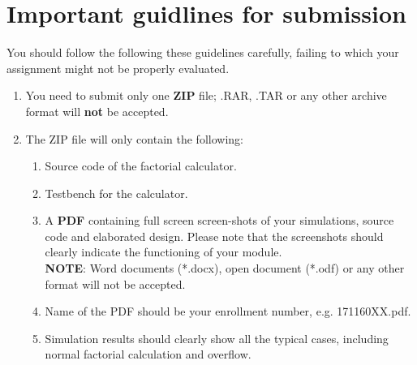 \documentclass[a4paper,10pt]{article}
\theoremstyle{mytheor}
\begin{document}
\section*{Important guidlines for submission}
You should follow the following these guidelines carefully, failing to
which your assignment might not be properly evaluated.
\begin{enumerate}
\item You need to submit only one \textbf{ZIP} file; .RAR, .TAR or any
  other archive format will \textbf{\color{red}not} be accepted.
\item The ZIP file will only contain the following:
  \begin{enumerate}
  \item Source code of the factorial calculator.
  \item Testbench for the calculator.
  \item A \textbf{PDF} containing full screen screen-shots of your
    simulations, source code and elaborated design. Please note that
    the screenshots should clearly indicate the functioning of your
    module.\\ \textbf{\color{red}NOTE}: Word documents (*.docx), open
    document (*.odf) or any other format will {\color{red}not} be
    accepted.
  \item Name of the PDF should be your enrollment number,
    e.g. 171160XX.pdf.
  \item Simulation results should clearly show all the typical cases,
    including normal factorial calculation and overflow.
  \end{enumerate}
\end{enumerate}
\end{document}
